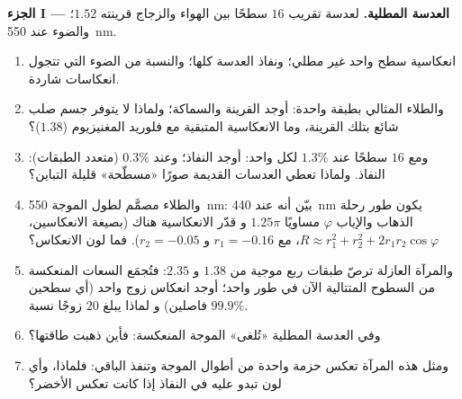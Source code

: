 \begin{problem}
\label{pb:b2:wave-interfaces:1}

\medskip
\noindent\textbf{الجزء I --- العدسة المطلية.}
لعدسة تقريب $16$ سطحًا بين الهواء والزجاج قرينته $1.52$؛ والضوء عند
\qty{550}{nm}.
\begin{enumerate}
  \item انعكاسية سطح واحد غير مطلي؛ ونفاذ العدسة
        كلها؛ والنسبة من الضوء التي تتجول انعكاسات شاردة.
  \item والطلاء المثالي بطبقة واحدة: أوجد القرينة والسماكة؛ ولماذا لا
        يتوفر جسم صلب شائع بتلك القرينة، وما
        الانعكاسية المتبقية مع فلوريد المغنيزيوم ($1.38$)؟
  \item ومع $16$ سطحًا عند $1.3\%$ لكل واحد: أوجد النفاذ؛ وعند $0.3\%$
        (متعدد الطبقات): النفاذ. ولماذا تعطي العدسات القديمة صورًا «مسطّحة»
        قليلة التباين؟
  \item والطلاء مصمَّم لطول الموجة \qty{550}{nm}: بيّن أنه عند
        \qty{440}{nm} يكون طور رحلة الذهاب والإياب $\varphi$ مساويًا $1.25\pi$ و
        قدّر الانعكاسية هناك (بصيغة الانعكاسين، $R
        \approx r_1^2 + r_2^2 + 2r_1r_2\cos\varphi$، مع $r_1 = -0.16$ و $r_2 =
        -0.05$). فما لون الانعكاس؟
  \item والمرآة العازلة ترصّ طبقات ربع موجية من $1.38$ و
        $2.35$: فتُجمَع السعات المنعكسة من السطوح المتتالية
        الآن في طور واحد؛ أوجد انعكاس زوج واحد (أي سطحين فاصلين) و
        لماذا يبلغ $20$ زوجًا نسبة $99.9\%$.
  \item وفي العدسة المطلية «تُلغى» الموجة المنعكسة: فأين
        ذهبت طاقتها؟
  \item ومثل هذه المرآة تعكس حزمة واحدة من أطوال الموجة وتنفذ
        الباقي: فلماذا، وأي لون تبدو عليه في النفاذ
        إذا كانت تعكس الأخضر؟
\end{enumerate}


\end{problem}
